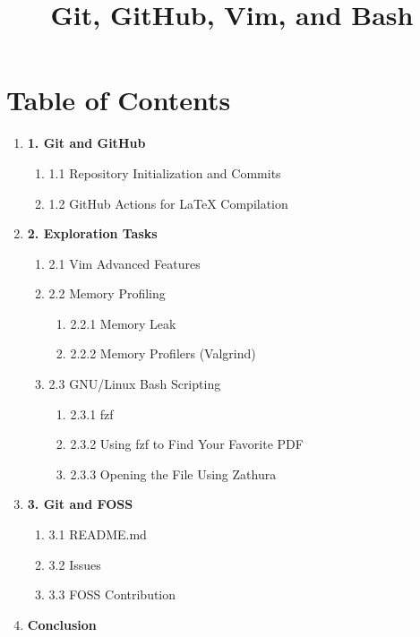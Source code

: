 \documentclass[12pt]{article}
\title{Git, GitHub, Vim, and Bash}
\author{}
\date{}
\begin{document}
\maketitle

\section*{Table of Contents}
\begin{enumerate}
    \item \textbf{1. Git and GitHub}
    \begin{enumerate}
        \item 1.1 Repository Initialization and Commits
        \item 1.2 GitHub Actions for LaTeX Compilation
    \end{enumerate}
    \item \textbf{2. Exploration Tasks}
    \begin{enumerate}
        \item 2.1 Vim Advanced Features
        \item 2.2 Memory Profiling
        \begin{enumerate}
            \item 2.2.1 Memory Leak
            \item 2.2.2 Memory Profilers (Valgrind)
        \end{enumerate}
        \item 2.3 GNU/Linux Bash Scripting
        \begin{enumerate}
            \item 2.3.1 fzf
            \item 2.3.2 Using fzf to Find Your Favorite PDF
            \item 2.3.3 Opening the File Using Zathura
        \end{enumerate}
    \end{enumerate}
    \item \textbf{3. Git and FOSS}
    \begin{enumerate}
        \item 3.1 README.md
        \item 3.2 Issues
        \item 3.3 FOSS Contribution
    \end{enumerate}
    \item \textbf{Conclusion}
\end{enumerate}

\newpage
\end{document}
